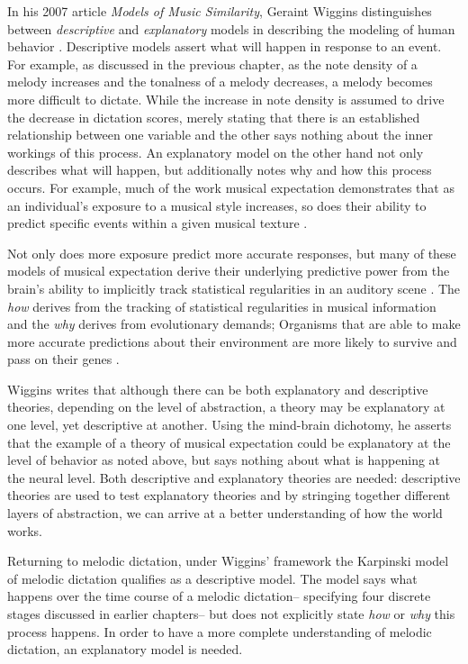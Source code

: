 \documentclass[]{book}
\begin{document}
In his 2007 article \emph{Models of Music Similarity}, Geraint Wiggins distinguishes between \emph{descriptive} and \emph{explanatory} models in describing the modeling of human behavior \citep{wigginsModelsMusicalSimilarity2007}.
Descriptive models assert what will happen in response to an event.
For example, as discussed in the previous chapter, as the note density of a melody increases and the tonalness of a melody decreases, a melody becomes more difficult to dictate.
While the increase in note density is assumed to drive the decrease in dictation scores, merely stating that there is an established relationship between one variable and the other says nothing about the inner workings of this process.
An explanatory model on the other hand not only describes what will happen, but additionally notes why and how this process occurs.
For example, much of the work musical expectation demonstrates that as an individual's exposure to a musical style increases, so does their ability to predict specific events within a given musical texture \citep{pearceStatisticalLearningProbabilistic2018a}.

Not only does more exposure predict more accurate responses, but many of these models of musical expectation derive their underlying predictive power from the brain's ability to implicitly track statistical regularities in an auditory scene \citep{saffranStatisticalLearningTone1999, margulisRepeatHowMusic2014}.
The \emph{how} derives from the tracking of statistical regularities in musical information and the \emph{why} derives from evolutionary demands; Organisms that are able to make more accurate predictions about their environment are more likely to survive and pass on their genes \citep{huronSweetAnticipation2006}.

Wiggins writes that although there can be both explanatory and descriptive theories, depending on the level of abstraction, a theory may be explanatory at one level, yet descriptive at another.
Using the mind-brain dichotomy, he asserts that the example of a theory of musical expectation could be explanatory at the level of behavior as noted above, but says nothing about what is happening at the neural level.
Both descriptive and explanatory theories are needed: descriptive theories are used to test explanatory theories and by stringing together different layers of abstraction, we can arrive at a better understanding of how the world works.

Returning to melodic dictation, under Wiggins' framework the Karpinski model of melodic dictation \citep{karpinskiAuralSkillsAcquisition2000, karpinskiModelMusicPerception1990} qualifies as a descriptive model.
The model says what happens over the time course of a melodic dictation-- specifying four discrete stages discussed in earlier chapters-- but does not explicitly state \emph{how} or \emph{why} this process happens.
In order to have a more complete understanding of melodic dictation, an explanatory model is needed.
\end{document}
